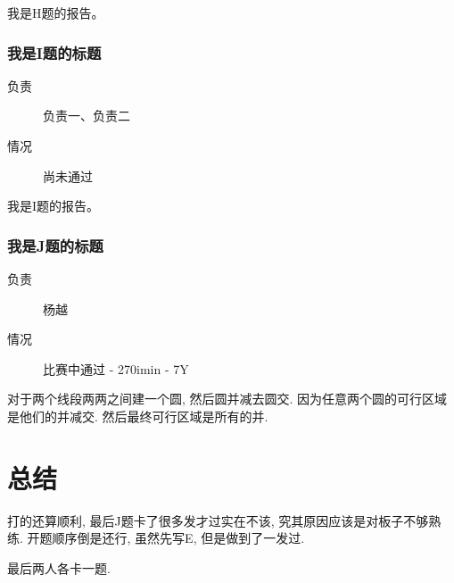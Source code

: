 \documentclass[a4paper, 11pt, nofonts, nocap, fancyhdr]{ctexart}
\newcommand{\problem}[1]{\subsubsection{#1}}
\begin{document}
我是H题的报告。

\problem{我是I题的标题}

\begin{description}
\item[负责] 负责一、负责二
\item[情况] 尚未通过
\end{description}

我是I题的报告。

\problem{我是J题的标题}

\begin{description}
\item[负责] 杨越
\item[情况] 比赛中通过 - 270imin - 7Y
\end{description}

对于两个线段两两之间建一个圆, 然后圆并减去圆交. 因为任意两个圆的可行区域是他们的并减交. 然后最终可行区域是所有的并. 

\section{总结}

打的还算顺利, 最后J题卡了很多发才过实在不该, 究其原因应该是对板子不够熟练. 开题顺序倒是还行, 虽然先写E, 但是做到了一发过. 

最后两人各卡一题.
\end{document}
